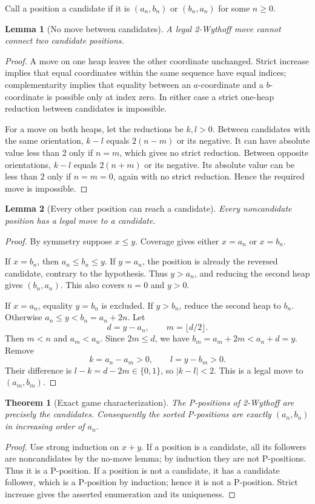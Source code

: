 \documentclass[11pt]{article}
\newtheorem{theorem}{Theorem}
\newtheorem{lemma}{Lemma}
\begin{document}
Call a position a candidate if it is $(a_n,b_n)$ or $(b_n,a_n)$ for some $n\ge0$.

\begin{lemma}[No move between candidates]
A legal 2-Wythoff move cannot connect two candidate positions.
\end{lemma}
\begin{proof}
A move on one heap leaves the other coordinate unchanged. Strict increase implies that equal coordinates within the same sequence have equal indices; complementarity implies that equality between an $a$-coordinate and a $b$-coordinate is possible only at index zero. In either case a strict one-heap reduction between candidates is impossible.

For a move on both heaps, let the reductions be $k,l>0$. Between candidates with the same orientation, $k-l$ equals $2(n-m)$ or its negative. It can have absolute value less than $2$ only if $n=m$, which gives no strict reduction. Between opposite orientations, $k-l$ equals $2(n+m)$ or its negative. Its absolute value can be less than $2$ only if $n=m=0$, again with no strict reduction. Hence the required move is impossible.
\end{proof}

\begin{lemma}[Every other position can reach a candidate]
Every noncandidate position has a legal move to a candidate.
\end{lemma}
\begin{proof}
By symmetry suppose $x\le y$. Coverage gives either $x=a_n$ or $x=b_n$.

If $x=b_n$, then $a_n\le b_n\le y$. If $y=a_n$, the position is already the reversed candidate, contrary to the hypothesis. Thus $y>a_n$, and reducing the second heap gives $(b_n,a_n)$. This also covers $n=0$ and $y>0$.

If $x=a_n$, equality $y=b_n$ is excluded. If $y>b_n$, reduce the second heap to $b_n$. Otherwise $a_n\le y<b_n=a_n+2n$. Let
\[
d=y-a_n,\qquad m=\lfloor d/2\rfloor.
\]
Then $m<n$ and $a_m<a_n$. Since $2m\le d$, we have
$b_m=a_m+2m<a_n+d=y$. Remove
\[
k=a_n-a_m>0,\qquad l=y-b_m>0.
\]
Their difference is $l-k=d-2m\in\{0,1\}$, so $|k-l|<2$. This is a legal move to $(a_m,b_m)$.
\end{proof}

\begin{theorem}[Exact game characterization]
The P-positions of 2-Wythoff are precisely the candidates. Consequently the sorted P-positions are exactly $(a_n,b_n)$ in increasing order of $a_n$.
\end{theorem}
\begin{proof}
Use strong induction on $x+y$. If a position is a candidate, all its followers are noncandidates by the no-move lemma; by induction they are not P-positions. Thus it is a P-position. If a position is not a candidate, it has a candidate follower, which is a P-position by induction; hence it is not a P-position. Strict increase gives the asserted enumeration and its uniqueness.
\end{proof}
\end{document}
